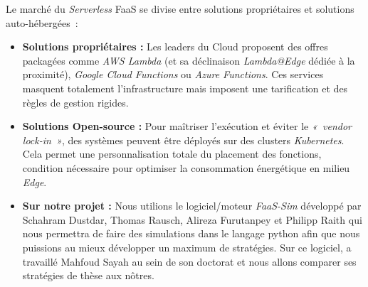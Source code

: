 Le marché du \textit{Serverless} FaaS se divise entre solutions propriétaires et solutions auto-hébergées~:

\begin{itemize}
    \item \textbf{Solutions propriétaires :} Les leaders du Cloud proposent des offres packagées comme \textit{AWS Lambda} (et sa déclinaison \textit{Lambda@Edge} dédiée à la proximité), \textit{Google Cloud Functions} ou \textit{Azure Functions}. Ces services masquent totalement l'infrastructure mais imposent une tarification et des règles de gestion rigides.
    \item \textbf{Solutions Open-source :} Pour maîtriser l'exécution et éviter le \textit{«~vendor lock-in~»}, des systèmes peuvent être déployés sur des clusters \textit{Kubernetes}. Cela permet une personnalisation totale du placement des fonctions, condition nécessaire pour optimiser la consommation énergétique en milieu \textit{Edge}.
    \item \textbf{Sur notre projet :} Nous utilions le logiciel/moteur \textit{FaaS-Sim} développé par Schahram Dustdar, Thomas Rausch, Alireza Furutanpey et Philipp Raith \cite{philipp_raith_faas} qui nous permettra de faire des simulations dans le langage python afin que nous puissions au mieux développer un maximum de stratégies. Sur ce logiciel, a travaillé Mahfoud Sayah \cite{mahfoud} au sein de son doctorat et nous allons comparer ses stratégies de thèse aux nôtres.
\end{itemize}
